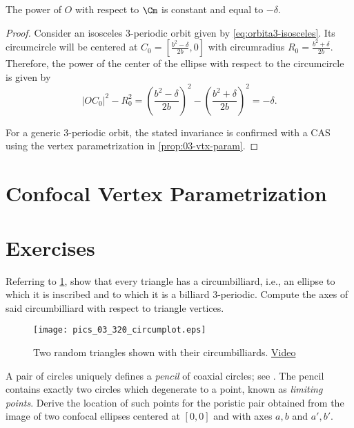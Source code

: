 \begin{proposition}
The power of $O$ with respect to $\Cm$ is constant and equal to $-\delta$.
\label{prop:03-delta}
\end{proposition}

\begin{proof}
Consider an isosceles 3-periodic orbit given by \cref{eq:orbita3-isosceles}.  
	Its circumcircle will be centered at $C_0=[ {\frac { {b}^{2}-\delta}{2b}},0]$ with circumradius $R_0=\frac {{b}^{2}+\delta}{2b}.$
	Therefore, the power of the center of the ellipse with respect to the circumcircle is given by  
	$$|OC_0|^2-R_0^2=\left(\frac { {b}^{2}-\delta}{2b}\right)^2 - \left(\frac {{b}^{2}+\delta}{2b}\right)^2=-\delta.$$
	
	For a generic 3-periodic orbit, the stated invariance is confirmed with a CAS using the vertex parametrization in \cref{prop:03-vtx-param}.  
\end{proof}

\section{Confocal Vertex Parametrization}


\section{Exercises}

\begin{exercise}
\label{ex:03-circumbilliard} 
Referring to \cref{fig:03-circumbilliard}, show that every triangle has a circumbilliard, i.e., an ellipse to which it is inscribed and to which it is a billiard 3-periodic. Compute the axes of said circumbilliard with respect to triangle vertices. 
\end{exercise}

\begin{figure}
    \centering
    \texttt{[image: pics\_03\_320\_circumplot.eps]}
    \caption{Two random triangles shown with their circumbilliards. \href{https://youtu.be/vSCnorIJ2X8}{Video}}
    \label{fig:03-circumbilliard}
\end{figure}

\begin{exercise}
A pair of circles uniquely defines a {\em pencil} of coaxial circles; see \cite[Limiting Points]{mw}. The pencil contains exactly two circles which degenerate to a point, known as {\em limiting points}. Derive the location of such points for the poristic pair obtained from the image of two confocal ellipses centered at $[0,0]$ and with axes $a,b$ and $a',b'$.
\end{exercise}

